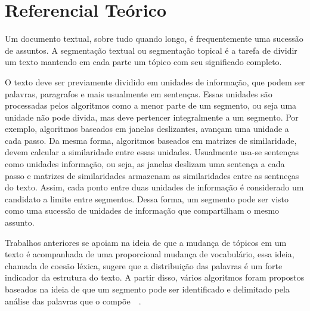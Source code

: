 \section{Referencial Teórico}
	\label{sec:referencial}
	
%
Um documento textual, sobre tudo quando longo, é frequentemente uma sucessão de assuntos. 
%
A segmentação textual ou segmentação topical é a tarefa de dividir um texto mantendo em cada parte um tópico com seu significado completo.
	


%
O texto deve ser previamente dividido em unidades de informação, que podem ser palavras, paragrafos e mais usualmente em sentenças. Essas unidades são processadas pelos algoritmos como a menor parte de um segmento, ou seja uma unidade não pode divida, mas deve pertencer integralmente a um segmento.
%
Por exemplo, algoritmos baseados em janelas deslizantes, avançam uma unidade a cada passo. Da mesma forma, algoritmos baseados em matrizes de similaridade, devem calcular a similaridade entre essas unidades.
%
Usualmente usa-se sentenças como unidades informação, ou seja, as janelas deslizam uma sentença a cada passo e matrizes de similaridades armazenam as similaridades entre as sentneças do texto.
%
Assim, cada ponto entre duas unidades de informação é considerado um candidato a limite entre segmentos.  
Dessa forma, um segmento pode ser visto como uma sucessão de unidades de informação que compartilham o mesmo assunto. 



Trabalhos anteriores se apoiam na ideia de que a mudança de tópicos em um texto é acompanhada de uma proporcional mudança de vocabulário, essa ideia, chamada de coesão léxica, sugere que a distribuição das palavras é um forte indicador da estrutura do texto. A partir disso, vários algoritmos foram propostos baseados na ideia de que um segmento pode ser identificado e delimitado pela análise das palavras que o compõe~\cite{Galley2003}~\cite{Boguraev2000}.




